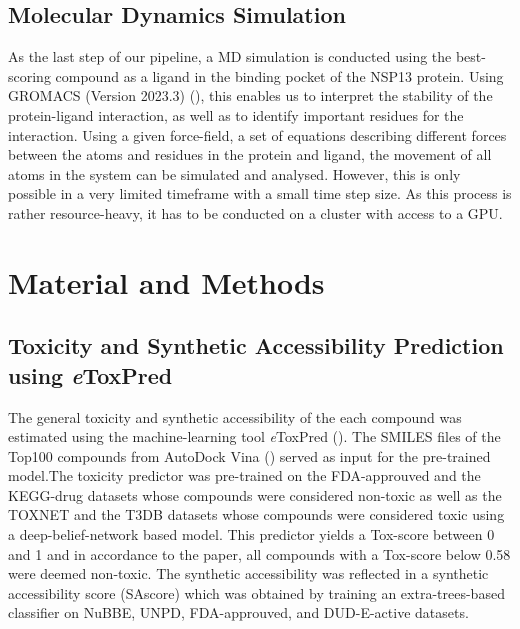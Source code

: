 \documentclass[11pt, letterpaper, titlepage]{article}
\begin{document}
\subsection{Molecular Dynamics Simulation}
As the last step of our pipeline, a \ac{MD} simulation is conducted using the best-scoring compound as a ligand in the binding pocket of the NSP13 protein. Using GROMACS (Version 2023.3) (\cite{package_GROMACS}), this enables us to interpret the stability of the protein-ligand interaction, as well as to identify important residues for the interaction. Using a given force-field, a set of equations describing different forces between the atoms and residues in the protein and ligand, the movement of all atoms in the system can be simulated and analysed. However, this is only possible in a very limited timeframe with a small time step size. As this process is rather resource-heavy, it has to be conducted on a cluster with access to a GPU. 


\section{Material and Methods}
\subsection{Toxicity and Synthetic Accessibility Prediction using \textit{e}ToxPred}
The general toxicity and synthetic accessibility of the each compound was estimated using the machine-learning tool \textit{e}ToxPred (\cite{pu2019toxpred}). The SMILES files of the Top100 compounds from AutoDock Vina (\cite{Trott.2010}) served as input for the pre-trained model.The toxicity predictor was pre-trained on the FDA-approuved and the KEGG-drug datasets whose compounds were considered non-toxic as well as the TOXNET and the T3DB datasets whose compounds were considered toxic using a deep-belief-network based model. This predictor yields a Tox-score between 0 and 1 and in accordance to the paper, all compounds with a Tox-score below 0.58 were deemed non-toxic. The synthetic accessibility was reflected in a synthetic accessibility score (SAscore) which was obtained by training an extra-trees-based classifier on NuBBE, UNPD, FDA-approuved, and DUD-E-active datasets.
\end{document}
